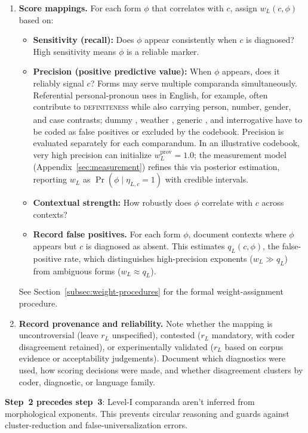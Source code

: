 \documentclass[12pt]{article}
\begin{document}
\begin{enumerate}[label=\arabic*., leftmargin=*]
  \item \textbf{Score mappings.} For each form $\phi$ that correlates with $c$, assign $w_L(c, \phi)$ based on:
  \begin{itemize}
    \item \textbf{Sensitivity (recall):} Does $\phi$ appear consistently when $c$ is diagnosed? High sensitivity means $\phi$ is a reliable marker.
    \item \textbf{Precision (positive predictive value):} When $\phi$ appears, does it reliably signal $c$? Forms may serve multiple comparanda simultaneously. Referential personal-pronoun uses in English, for example, often contribute to \textsc{definiteness}\textsubscript{\Cross} while also carrying person, number, gender, and case contrasts; dummy , weather , generic , and interrogative  have to be coded as false positives or excluded by the codebook. Precision is evaluated separately for each comparandum. In an illustrative codebook, very high precision can initialize $w_L^{\text{prov}} = 1.0$; the measurement model (Appendix~\ref{sec:measurement}) refines this via posterior estimation, reporting $w_L$ as $\Pr(\phi \mid \eta_{L,c}=1)$ with credible intervals.
    \item \textbf{Contextual strength:} How robustly does $\phi$ correlate with $c$ across contexts?
    \item \textbf{Record false positives.} For each form $\phi$, document contexts where $\phi$ appears but $c$ is diagnosed as absent. This estimates $q_L(c,\phi)$, the false-positive rate, which distinguishes high-precision exponents ($w_L \gg q_L$) from ambiguous forms ($w_L \approx q_L$).
  \end{itemize}
  See Section~\ref{subsec:weight-procedures} for the formal weight-assignment procedure.

  \item \textbf{Record provenance and reliability.} Note whether the mapping is uncontroversial (leave $r_L$ unspecified), contested ($r_L$ mandatory, with coder disagreement retained), or experimentally validated ($r_L$ based on corpus evidence or acceptability judgements). Document which diagnostics were used, how scoring decisions were made, and whether disagreement clusters by coder, diagnostic, or language family.
\end{enumerate}

\noindent \textbf{Step~2 precedes step~3}: Level-I comparanda aren't inferred from morphological exponents. This prevents circular reasoning and guards against cluster-reduction and false-universalization errors.
\end{document}

